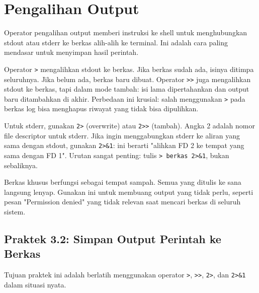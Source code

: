 \section{Pengalihan Output}
\label{sec:io-redirection}

Operator pengalihan output memberi instruksi ke shell untuk menghubungkan stdout atau stderr ke berkas alih-alih ke terminal. Ini adalah cara paling mendasar untuk menyimpan hasil perintah.

Operator \texttt{>} mengalihkan stdout ke berkas. Jika berkas sudah ada, isinya ditimpa seluruhnya. Jika belum ada, berkas baru dibuat. Operator \texttt{>>} juga mengalihkan stdout ke berkas, tapi dalam mode tambah: isi lama dipertahankan dan output baru ditambahkan di akhir. Perbedaan ini krusial: salah menggunakan \texttt{>} pada berkas log bisa menghapus riwayat yang tidak bisa dipulihkan.

Untuk stderr, gunakan \texttt{2>} (overwrite) atau \texttt{2>>} (tambah). Angka 2 adalah nomor file descriptor untuk stderr. Jika ingin menggabungkan stderr ke aliran yang sama dengan stdout, gunakan \texttt{2>\&1}: ini berarti "alihkan FD 2 ke tempat yang sama dengan FD 1". Urutan sangat penting: tulis \texttt{> berkas 2>\&1}, bukan sebaliknya.

Berkas khusus  berfungsi sebagai tempat sampah. Semua yang ditulis ke sana langsung lenyap. Gunakan ini untuk membuang output yang tidak perlu, seperti pesan "Permission denied" yang tidak relevan saat mencari berkas di seluruh sistem.

\subsection*{Praktek 3.2: Simpan Output Perintah ke Berkas}

Tujuan praktek ini adalah berlatih menggunakan operator \texttt{>}, \texttt{>>}, \texttt{2>}, dan \texttt{2>\&1} dalam situasi nyata.

